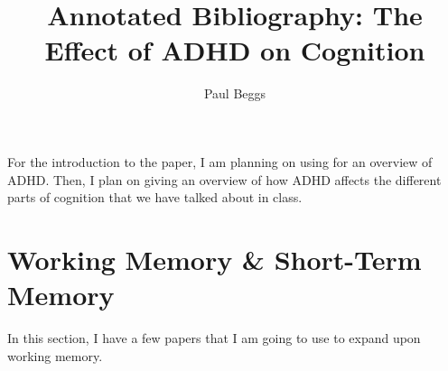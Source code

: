 \documentclass[stu]{apa7}
\title{Annotated Bibliography: The Effect of ADHD on Cognition}
\author{Paul Beggs}
\begin{document}
\maketitle


For the introduction to the paper, I am planning on using \textcite{faraone_attention-deficithyperactivity_2015} for an overview of ADHD. Then, I plan on giving an overview of how ADHD affects the different parts of cognition that we have talked about in class. 

\section{Working Memory \& Short-Term Memory}

In this section, I have a few papers that I am going to use to expand upon working memory. 
\end{document}
